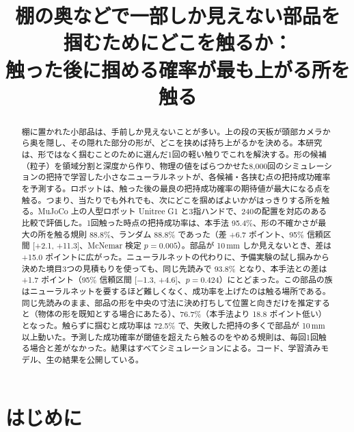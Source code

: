 \documentclass[conference]{IEEEtran}
\begin{document}
\title{棚の奥などで一部しか見えない部品を\\掴むためにどこを触るか：\\触った後に掴める確率が最も上がる所を触る}

\author{\IEEEauthorblockN{\AuthorName}
}

\maketitle

\begin{abstract}
棚に置かれた小部品は、手前しか見えないことが多い。上の段の天板が頭部カメラから奥を隠し、その隠れた部分の形が、どこを挟めば持ち上がるかを決める。本研究は、形ではなく掴むことのために選んだ1回の軽い触りでこれを解決する。形の候補（粒子）を領域分割と深度から作り、物理の値をばらつかせた8,000回のシミュレーションの把持で学習した小さなニューラルネットが、各候補・各挟む点の把持成功確率を予測する。ロボットは、触った後の最良の把持成功確率の期待値が最大になる点を触る。つまり、当たりでも外れでも、次にどこを掴めばよいかがはっきりする所を触る。MuJoCo 上の人型ロボット Unitree G1 と3指ハンドで、240の配置を対応のある比較で評価した。1回触った時点の把持成功率は、本手法 95.4\%、形の不確かさが最大の所を触る規則 88.8\%、ランダム 88.8\% であった（差 +6.7 ポイント、95\% 信頼区間 [+2.1, +11.3]、McNemar 検定 $p=0.005$）。部品が 10\,mm しか見えないとき、差は +15.0 ポイントに広がった。ニューラルネットの代わりに、予備実験の試し掴みから決めた境目3つの見積もりを使っても、同じ先読みで 93.8\% となり、本手法との差は +1.7 ポイント（95\% 信頼区間 [$-$1.3, +4.6]、$p=0.424$）にとどまった。この部品の族はニューラルネットを要するほど難しくなく、成功率を上げたのは触る場所である。同じ先読みのまま、部品の形を中央の寸法に決め打ちして位置と向きだけを推定すると（物体の形を既知とする場合にあたる）、76.7\%（本手法より 18.8 ポイント低い）となった。触らずに掴むと成功率は 72.5\% で、失敗した把持の多くで部品が 10\,mm 以上動いた。予測した成功確率が閾値を超えたら触るのをやめる規則は、毎回1回触る場合と差がなかった。結果はすべてシミュレーションによる。コード、学習済みモデル、生の結果を公開している。
\end{abstract}

\section{はじめに}
\end{document}

